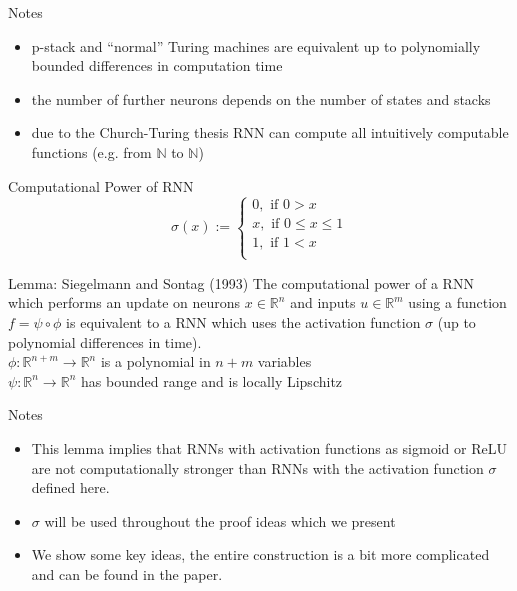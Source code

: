 \begin{frame}[beamer:0]{Notes}
\begin{itemize}
\item p-stack and ``normal'' Turing machines are equivalent up to polynomially bounded differences in computation time
\item the number of further neurons depends on the number of states and stacks
\item due to the Church-Turing thesis RNN can compute all intuitively computable functions (e.g. from $\mathbb{N}$ to $\mathbb{N}$) 
\end{itemize}
\end{frame}

\begin{frame}{Computational Power of RNN}
\[ \sigma(x) := \begin{cases}
0, \text{\ if } 0 > x\\
x, \text{\ if } 0 \leq x \leq 1\\
1, \text{\ if } 1 < x\\
\end{cases} \]
\begin{alertblock}{Lemma: Siegelmann and Sontag (1993) \cite{SiSo93}}
The computational power of a RNN which performs an update on neurons $x \in \mathbb{R}^n$ and inputs $u \in \mathbb{R}^m$ using a function $f = \psi \circ \phi$ is equivalent to a RNN which uses the activation function $\sigma$ (up to polynomial differences in time). \\
$\phi: \mathbb{R}^{n+m} \rightarrow \mathbb{R}^n$ is a polynomial in $n+m$ variables \\
$\psi: \mathbb{R}^n \rightarrow \mathbb{R}^n$ has bounded range and is locally Lipschitz
\end{alertblock}
\end{frame}

\begin{frame}[beamer:0]{Notes}
\begin{itemize}
\item This lemma implies that RNNs with activation functions as sigmoid or ReLU are not computationally stronger than RNNs with the activation function $\sigma$ defined here.
\item $\sigma$ will be used throughout the proof ideas which we present
\item We show some key ideas, the entire construction is a bit more complicated and can be found in the paper.
\end{itemize}
\end{frame}


